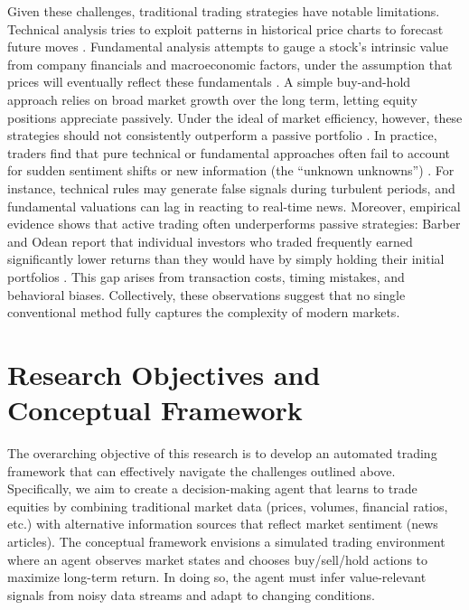 Given these challenges, traditional trading strategies have notable limitations. Technical analysis tries to exploit patterns in historical price charts to forecast future moves \cite{Murphy1999}. Fundamental analysis attempts to gauge a stock’s intrinsic value from company financials and macroeconomic factors, under the assumption that prices will eventually reflect these fundamentals \cite{Penman2013}. A simple buy-and-hold approach relies on broad market growth over the long term, letting equity positions appreciate passively. Under the ideal of market efficiency, however, these strategies should not consistently outperform a passive portfolio \cite{Malkiel2003}. In practice, traders find that pure technical or fundamental approaches often fail to account for sudden sentiment shifts or new information (the “unknown unknowns”) \cite{Taleb2007}. For instance, technical rules may generate false signals during turbulent periods, and fundamental valuations can lag in reacting to real-time news. Moreover, empirical evidence shows that active trading often underperforms passive strategies: Barber and Odean report that individual investors who traded frequently earned significantly lower returns than they would have by simply holding their initial portfolios \cite{Barber2000}. This gap arises from transaction costs, timing mistakes, and behavioral biases. Collectively, these observations suggest that no single conventional method fully captures the complexity of modern markets.

\section{Research Objectives and Conceptual Framework}
\label{sec:objectives}
The overarching objective of this research is to develop an automated trading framework that can effectively navigate the challenges outlined above. Specifically, we aim to create a decision-making agent that learns to trade equities by combining traditional market data (prices, volumes, financial ratios, etc.) with alternative information sources that reflect market sentiment (news articles). The conceptual framework envisions a simulated trading environment where an agent observes market states and chooses buy/sell/hold actions to maximize long-term return. In doing so, the agent must infer value-relevant signals from noisy data streams and adapt to changing conditions.

